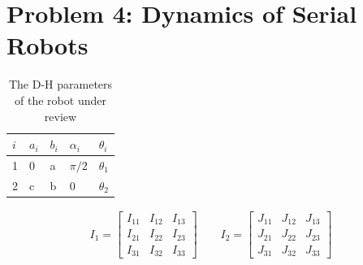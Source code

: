 \documentclass[conference]{IEEEtran}
\begin{document}
\section{Problem 4: Dynamics of Serial Robots}
\begin{table}[htbp]
    \caption{The D-H parameters of the robot under review}
    \def\arraystretch{1.45}
    \begin{center}
        \begin{tabular}{|Y|Y|Y|Y|Y|}
            \hline
            $i$ & $a_i$ & $b_i$ & $\alpha_i$ & $\theta_i$ \\
               & 0     & a     & $\pi / 2$  & $\theta_1$ \\
               & c     & b     & 0          & $\theta_2$ \\
            \hline
        \end{tabular}
    \end{center}
\end{table}

\begin{align*}
    I_1 = \begin{bmatrix}
              I_{11} & I_{12} & I_{13} \\
              I_{21} & I_{22} & I_{23} \\
              I_{31} & I_{32} & I_{33}
          \end{bmatrix} \quad \quad
    I_2 = \begin{bmatrix}
              J_{11} & J_{12} & J_{13} \\
              J_{21} & J_{22} & J_{23} \\
              J_{31} & J_{32} & J_{33}
          \end{bmatrix}
\end{align*}
\end{document}
